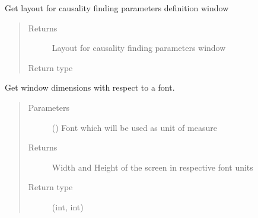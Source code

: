 \documentclass[letterpaper,10pt,english]{sphinxmanual}
\begin{document}

\begin{fulllineitems}
\label{\detokenize{layout:layout.get_param_layout}}
\sphinxAtStartPar
Get layout for causality finding parameters definition window
\begin{quote}\begin{description}
\item[{Returns}] \leavevmode
\sphinxAtStartPar
Layout for causality finding parameters window

\item[{Return type}] \leavevmode
\sphinxAtStartPar
{}

\end{description}\end{quote}

\end{fulllineitems}


\begin{fulllineitems}
\label{\detokenize{layout:layout.window_dimension}}
\sphinxAtStartPar
Get window dimensions with respect to a font.
\begin{quote}\begin{description}
\item[{Parameters}] \leavevmode
\sphinxAtStartPar
{} () \textendash{} Font which will be used as unit of measure

\item[{Returns}] \leavevmode
\sphinxAtStartPar
Width and Height of the screen in respective font units

\item[{Return type}] \leavevmode
\sphinxAtStartPar
(int, int)

\end{description}\end{quote}

\end{fulllineitems}
\end{document}
